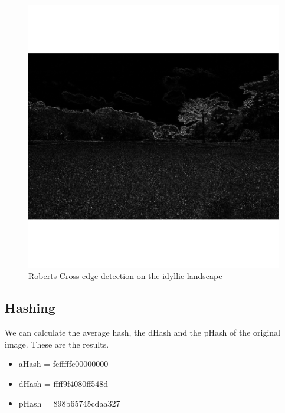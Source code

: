 \documentclass[12pt]{article}
\begin{document}
\begin{figure}[h]
\centering
\includegraphics[]{img/landscape_RobertsCross}
\caption{Roberts Cross edge detection on the idyllic landscape}
\end{figure}

\subsection{Hashing}
We can calculate the average hash, the dHash and the pHash of the original image. These are the results.

\begin{itemize}
\item aHash = fefffffc00000000
\item dHash = ffff9f4080ff548d
\item pHash = 898b65745cdaa327
\end{itemize}
\end{document}
